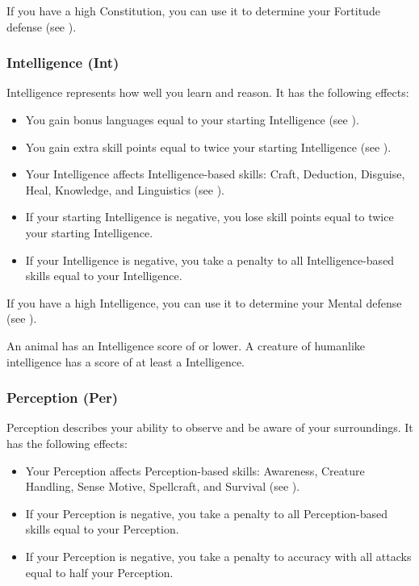             If you have a high Constitution, you can use it to determine your Fortitude defense (see ).

        \subsubsection{Intelligence (Int)}\label{Intelligence}
            Intelligence represents how well you learn and reason.
            It has the following effects:

            \begin{itemize}
                \item You gain bonus languages equal to your starting Intelligence (see ).
                \item You gain extra skill points equal to twice your starting Intelligence (see ).
                \item Your Intelligence affects Intelligence-based skills: Craft, Deduction, Disguise, Heal, Knowledge, and Linguistics (see ).
                \item If your starting Intelligence is negative, you lose skill points equal to twice your starting Intelligence.
                \item If your Intelligence is negative, you take a penalty to all Intelligence-based skills equal to your Intelligence.
            \end{itemize}

            If you have a high Intelligence, you can use it to determine your Mental defense (see ).

            \par An animal has an Intelligence score of  or lower.
            A creature of humanlike intelligence has a score of at least a  Intelligence.

        \subsubsection{Perception (Per)}\label{Perception}
            Perception describes your ability to observe and be aware of your surroundings.
            It has the following effects:
            \begin{itemize}
                \item Your Perception affects Perception-based skills: Awareness, Creature Handling, Sense Motive, Spellcraft, and Survival (see ).
                \item If your Perception is negative, you take a penalty to all Perception-based skills equal to your Perception.
                \item If your Perception is negative, you take a penalty to accuracy with all attacks equal to half your Perception.
            \end{itemize}

